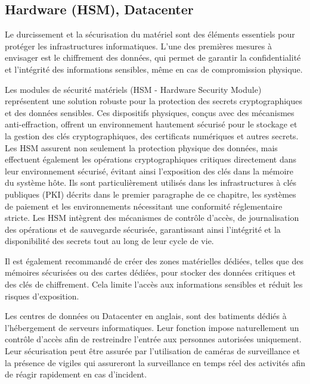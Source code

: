\subsection{Hardware (HSM), Datacenter}

Le durcissement et la sécurisation du matériel sont des éléments essentiels pour protéger les infrastructures informatiques. L'une des premières mesures à envisager est le chiffrement des données, qui permet de garantir la confidentialité et l'intégrité des informations sensibles, même en cas de compromission physique.

Les modules de sécurité matériels (HSM - Hardware Security Module) représentent une solution robuste pour la protection des secrets cryptographiques et des données sensibles. Ces dispositifs physiques, conçus avec des mécanismes anti-effraction, offrent un environnement hautement sécurisé pour le stockage et la gestion des clés cryptographiques, des certificats numériques et autres secrets. Les HSM assurent non seulement la protection physique des données, mais effectuent également les opérations cryptographiques critiques directement dans leur environnement sécurisé, évitant ainsi l'exposition des clés dans la mémoire du système hôte. Ils sont particulièrement utilisés dans les infrastructures à clés publiques (PKI) décrits dans le premier paragraphe de ce chapitre, les systèmes de paiement et les environnements nécessitant une conformité réglementaire stricte. Les HSM intègrent des mécanismes de contrôle d'accès, de journalisation des opérations et de sauvegarde sécurisée, garantissant ainsi l'intégrité et la disponibilité des secrets tout au long de leur cycle de vie.

Il est également recommandé de créer des zones matérielles dédiées, telles que des mémoires sécurisées ou des cartes dédiées, pour stocker des données critiques et des clés de chiffrement. Cela limite l'accès aux informations sensibles et réduit les risques d'exposition.

Les centres de données ou Datacenter en anglais, sont des batiments dédiés à l'hébergement de serveurs informatiques. Leur fonction impose naturellement un contrôle d'accès afin de restreindre l'entrée aux personnes autorisées uniquement. Leur sécurisation peut être assurée par l'utilisation de caméras de surveillance et la présence de vigiles qui assureront la surveillance en temps réel des activités afin de réagir rapidement en cas d'incident.


